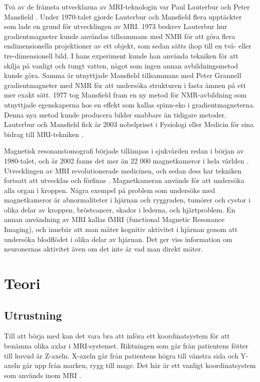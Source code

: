 \documentclass[11pt, a4paper]{article}
\begin{document}
Två av de främsta utvecklarna av MRI-teknologin var Paul Lauterbur och Peter Mansfield \parencite{mri_nobelpris_pressmeddelande}. Under 1970-talet gjorde Lauterbur och Mansfield flera upptäckter som lade en grund för utvecklingen av MRI. 1973 beskrev Lauterbur hur gradientmagneter kunde användas tillsammans med NMR för att göra flera endimensionella projektioner av ett objekt, som sedan sätts ihop till en två- eller tre-dimensionell bild. I hans experiment kunde han använda tekniken för att skilja på vanligt och tungt vatten, något som ingen annan avbildningsmetod kunde göra. Samma år utnyttjade Mansfield tillsammans med Peter Grannell gradientmagneter med NMR för att undersöka strukturen i fasta ämnen på ett mer exakt sätt. 1977 tog Mansfield fram en ny metod för NMR-avbildning som utnyttjade egenskaperna hos en effekt som kallas spinn-eko i gradientmagneterna. Denna nya metod kunde producera bilder snabbare än tidigare metoder. Lauterbur och Mansfield fick år 2003 nobelpriset i Fysiologi eller Medicin för sina bidrag till MRI-tekniken \parencite{mri_nobelpris_pressmeddelande}.

Magnetisk resonanstomografi började tillämpas i sjukvården redan i början av 1980-talet, och år 2002 fanns det mer än 22 000 magnetkameror i hela världen \parencite{mri_nobelpris_pressmeddelande}. Utvecklingen av MRI revolutionerade medicinen, och sedan dess har tekniken fortsatt att utvecklas och förfinas \parencite{mri_facts}. Magnetkameran används för att undersöka alla organ i kroppen. Några exempel på problem som undersöks med magnetkameror är abnormaliteter i hjärnan och ryggraden, tumörer och cystor i olika delar av kroppen, bröstcancer, skador i lederna, och hjärtproblem. En annan användning av MRI kallas fMRI (functional Magnetic Resonance Imaging), och innebär att man mäter kognitiv aktivitet i hjärnan genom att undersöka blodflödet i olika delar av hjärnan. Det ger viss information om neuronernas aktivitet även om det inte är vad man direkt mäter.

\clearpage
\section{Teori}
\subsection{Utrustning}
Till att börja med kan det vara bra att införa ett koordinatsystem för att benämna olika axlar i MRI-systemet. Riktningen som går från patientens fötter till huvud är Z-axeln. X-axeln går från patientens högra till vänstra sida och Y-axeln går upp från marken, rygg till mage. Det här är ett vanligt koordinatsystem som används inom MRI \parencite{mri_for_radiologists}.
\end{document}
